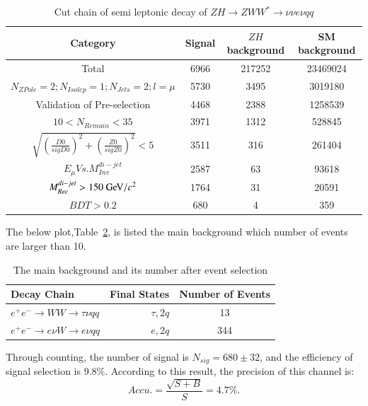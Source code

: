 \documentclass[11pt,a4paper]{cepcnote}
\begin{document}
\begin{table}[H]
  \begin{center}
    \begin{tabular}{cccc}
      \hline \hline
      \multicolumn{1}{c}{Category}&\multicolumn{1}{c}{Signal}&\multicolumn{1}{c}{$ZH$ background}&\multicolumn{1}{c}{SM background}\\ 
      \hline
      Total 	      	 									&   6966	& 217252& 23469024	\\
	  $N_{ZPole}=2; N_{Isolep}=1; N_{Jets} =2; l = \mu$		&   5730	& 3495	& 3019180	\\
	  Validation of Pre-selection							&	4468	& 2388	& 1258539	\\
	  $10 < N_{Remain} < 35$								&	3971	& 1312	& 528845	\\
	  $\sqrt{(\frac{D0}{sigD0})^2+(\frac{Z0}{sigZ0})^2} < 5$&	3511	& 316	& 261404	\\
	  $E_{\mu} Vs. M_{Inv}^{di-jet}$						&	2587	& 63	& 93618		\\
	  $M_{Rec}^{di-jet} > 150\gev/c^2$						&   1764	& 31	& 20591		\\
	  $BDT >0.2$											&   680  	& 4 	& 359		\\
      \hline \hline
    \end{tabular}
  \caption[Monte Carlo purities in the single lepton sample]{%
    Cut chain of semi leptonic decay of $ZH\rightarrow ZWW^* \rightarrow \nu\nu e\nu qq$}
  \label{tab:cutchainvvevqq}
  \end{center}
\end{table}
The below plot,Table~\ref{tab:bkginvvevqq}, is listed the main background which number of events are larger than 10.
\begin{table}[H]
	\begin{center}
		\begin{tabular}{lrc}
			\hline\hline
			Decay Chain	& Final States 	&	Number of Events	\\
			\hline
			$e^+e^-\to WW \to \tau\nu qq $ 	& $\tau, 2q$	&	13\\
			$e^+e^-\to e\nu W \to e\nu qq $ & $e, 2q$		&	344\\
			\hline\hline
		\end{tabular}
		\caption[]{The main background and its number after event selection}
		\label{tab:bkginvvevqq}
	\end{center}
\end{table}
Through counting, the number of signal is $N_{sig} = 680\pm 32$, and the efficiency of signal selection is 9.8\%.
According to this result, the precision of this channel is:
\begin{equation*}
	Accu. =\frac{\sqrt{S+B}}{S} = 4.7\%.
\end{equation*}
\end{document}
